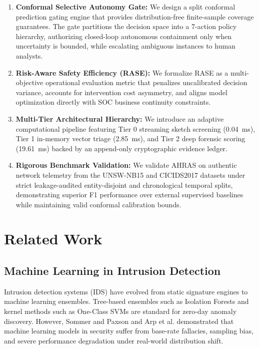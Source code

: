 \documentclass[10pt,journal,compsoc]{IEEEtran}
\begin{document}
\begin{enumerate}
    \item \textbf{Conformal Selective Autonomy Gate:} We design a split conformal prediction gating engine that provides distribution-free finite-sample coverage guarantees. The gate partitions the decision space into a 7-action policy hierarchy, authorizing closed-loop autonomous containment only when uncertainty is bounded, while escalating ambiguous instances to human analysts.
    \item \textbf{Risk-Aware Safety Efficiency (RASE):} We formalize RASE as a multi-objective operational evaluation metric that penalizes uncalibrated decision variance, accounts for intervention cost asymmetry, and aligns model optimization directly with SOC business continuity constraints.
    \item \textbf{Multi-Tier Architectural Hierarchy:} We introduce an adaptive computational pipeline featuring Tier 0 streaming sketch screening (0.04~ms), Tier 1 in-memory vector triage (2.85~ms), and Tier 2 deep forensic scoring (19.61~ms) backed by an append-only cryptographic evidence ledger.
    \item \textbf{Rigorous Benchmark Validation:} We validate AHRAS on authentic network telemetry from the UNSW-NB15 and CICIDS2017 datasets under strict leakage-audited entity-disjoint and chronological temporal splits, demonstrating superior F1 performance over external supervised baselines while maintaining valid conformal calibration bounds.
\end{enumerate}

\section{Related Work}
\subsection{Machine Learning in Intrusion Detection}
Intrusion detection systems (IDS) have evolved from static signature engines \cite{sommer2010outside} to machine learning ensembles. Tree-based ensembles such as Isolation Forests \cite{liu2008isolation} and kernel methods such as One-Class SVMs \cite{scholkopf2001estimating} are standard for zero-day anomaly discovery. However, Sommer and Paxson \cite{sommer2010outside} and Arp et al. \cite{arp2022dos} demonstrated that machine learning models in security suffer from base-rate fallacies, sampling bias, and severe performance degradation under real-world distribution shift.
\end{document}
